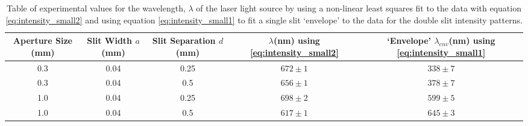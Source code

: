 \documentclass{article}
\begin{document}
\vspace{5mm}
\begin{table*}[h]
\centering %
\caption{Table of experimental values for the wavelength, $\lambda$ of the laser light source by using a non-linear least squares fit to the data with equation \eqref{eq:intensity_small2}  and using equation \eqref{eq:intensity_small1} to fit a single slit `envelope' to the data for the double slit intensity patterns.}
\label{tab:table5}
\begin{tabular}{|c|c|c|c|c|}
\hline
Aperture Size (mm) & Slit Width $a$(mm) & Slit Separation $d$(mm) & $\lambda$(nm) using \eqref{eq:intensity_small2} & `Envelope' $\lambda_{env}$(nm) using \eqref{eq:intensity_small1} \\
\hline
0.3 & 0.04 & 0.25 & $672 \pm 1$ & $338 \pm 7$ \\
\hline
0.3 & 0.04 & 0.5 & $656 \pm 1$ & $378 \pm 7$ \\
\hline
1.0 & 0.04 & 0.25 & $698 \pm 2$ & $599 \pm 5$ \\
\hline
1.0 & 0.04 & 0.5 & $617 \pm 1$ & $645 \pm 3$ \\
\hline
\end{tabular}
\end{table*}










\end{document}
